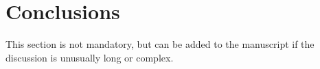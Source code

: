 \section{Conclusions}

This section is not mandatory, but can be added to the manuscript if the discussion is unusually long or complex.

